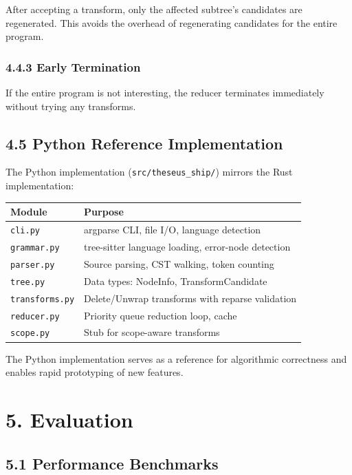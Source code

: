 \documentclass[
  letterpaper,
]{article}
\newcounter{none} %
\begin{document}
After accepting a transform, only the affected subtree's candidates are
regenerated. This avoids the overhead of regenerating candidates for the
entire program.

\subsubsection{4.4.3 Early Termination}\label{early-termination}

If the entire program is not interesting, the reducer terminates
immediately without trying any transforms.

\subsection{4.5 Python Reference
Implementation}\label{python-reference-implementation}

The Python implementation (\texttt{src/theseus\_ship/}) mirrors the Rust
implementation:

{\def\LTcaptype{none} %
\begin{longtable}[]{@{}ll@{}}
\toprule\noalign{}
Module & Purpose \\
\midrule\noalign{}
\endhead
\bottomrule\noalign{}
\endlastfoot
\texttt{cli.py} & argparse CLI, file I/O, language detection \\
\texttt{grammar.py} & tree-sitter language loading, error-node
detection \\
\texttt{parser.py} & Source parsing, CST walking, token counting \\
\texttt{tree.py} & Data types: NodeInfo, TransformCandidate \\
\texttt{transforms.py} & Delete/Unwrap transforms with reparse
validation \\
\texttt{reducer.py} & Priority queue reduction loop, cache \\
\texttt{scope.py} & Stub for scope-aware transforms \\
\end{longtable}
}

The Python implementation serves as a reference for algorithmic
correctness and enables rapid prototyping of new features.

\section{5. Evaluation}\label{evaluation-1}

\subsection{5.1 Performance Benchmarks}\label{performance-benchmarks}
\end{document}
